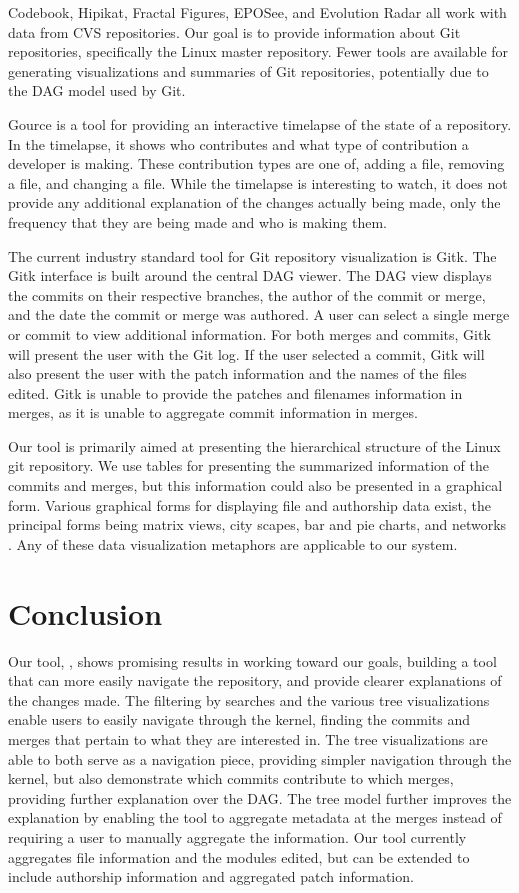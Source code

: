 \documentclass[conference, draftclsnofoot, draft]{IEEEtran}
\begin{document}
Codebook, Hipikat, Fractal Figures, EPOSee, and Evolution Radar all work with data
from CVS repositories. Our goal is to provide information about Git repositories,
specifically the Linux master repository. Fewer tools are available for generating
visualizations and summaries of Git repositories, potentially due to the DAG model
used by Git.

Gource is a tool for providing an interactive timelapse of the state of a
repository\cite{Caudwell2010}. In the timelapse, it shows who contributes and what
type of contribution a developer is making. These contribution types are one of,
adding a file, removing a file, and changing a file. While the timelapse is
interesting to watch, it does not provide any additional explanation of the changes
actually being made, only the frequency that they are being made and who is making
them.

The current industry standard tool for Git repository visualization is Gitk. The
Gitk interface is built around the central DAG viewer. The DAG view displays the
commits on their respective branches, the author of the commit or merge, and the
date the commit or merge was authored. A user can select a single merge or commit
to view additional information. For both merges and commits, Gitk will present the
user with the Git log. If the user selected a commit, Gitk will also present the
user with the patch information and the names of the files edited. Gitk is unable to
provide the patches and filenames information in merges, as it is unable to
aggregate commit information in merges.

Our tool is primarily aimed at presenting the hierarchical structure of the Linux
git repository. We use tables for presenting the summarized information of the
commits and merges, but this information could also be presented in a graphical
form. Various graphical forms for displaying file and authorship data exist, the
principal forms being matrix views, city scapes, bar and pie charts, and networks
\cite{Eick2002}. Any of these data visualization metaphors are applicable to our
system.

\section{Conclusion}

Our tool, \tool, shows promising results in working toward our goals, building a tool that
can more easily navigate the repository, and provide clearer explanations of the
changes made. The filtering by searches and the various tree visualizations enable
users to easily navigate through the kernel, finding the commits and merges that
pertain to what they are interested in. The tree visualizations are able to both
serve as a navigation piece, providing simpler navigation through the kernel, but
also demonstrate which commits contribute to which merges, providing further
explanation over the DAG. The tree model further improves the explanation by enabling
the tool to aggregate metadata at the merges instead of requiring a user to manually
aggregate the information. Our tool currently aggregates file information and the
modules edited, but can be extended to include authorship information and aggregated
patch information.
\end{document}
